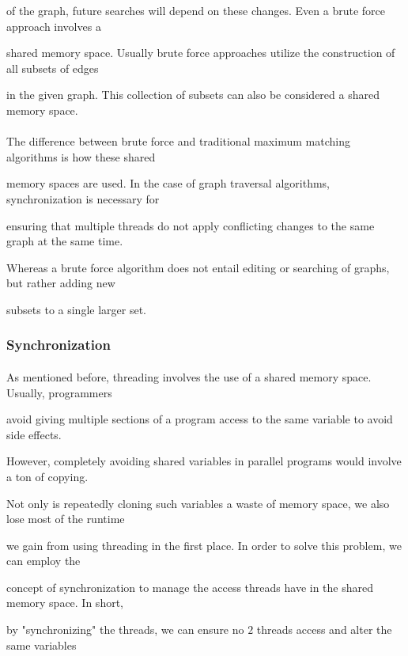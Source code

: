 of the graph, future searches will depend on these changes. Even a brute force approach involves a 

shared memory space. Usually brute force approaches utilize the construction of all subsets of edges

in the given graph. This collection of subsets can also be considered a shared memory space. 


\paragraph{}
The difference between brute force and traditional maximum matching algorithms is how these shared 

memory spaces are used. In the case of graph traversal algorithms, synchronization is necessary for

ensuring that multiple threads do not apply conflicting changes to the same graph at the same time. 

Whereas a brute force algorithm does not entail editing or searching of graphs, but rather adding new 

subsets to a single larger set. 


\subsubsection*{Synchronization}


\paragraph{}
As mentioned before, threading involves the use of a shared memory space. Usually, programmers 

avoid giving multiple sections of a program access to the same variable to avoid side effects. 

However, completely avoiding shared variables in parallel programs would involve a ton of copying. 

Not only is repeatedly cloning such variables a waste of memory space, we also lose most of the runtime

we gain from using threading in the first place. In order to solve this problem, we can employ the 

concept of synchronization to manage the access threads have in the shared memory space. In short,

by "synchronizing" the threads, we can ensure no $2$ threads access and alter the same variables 

